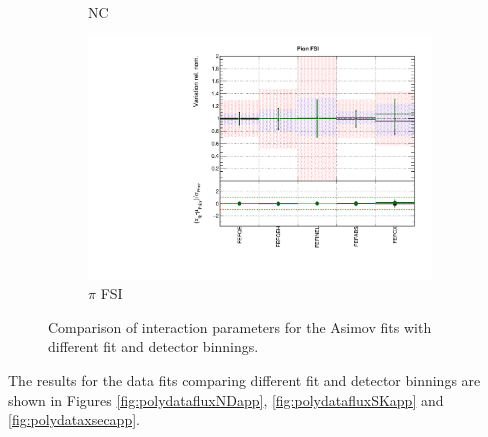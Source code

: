 \begin{figure}[!htbp]
\begin{subfigure}{0.49\textwidth}
  \caption{NC}
\end{subfigure}
\begin{subfigure}{0.49\textwidth}
  \centering
  \includegraphics[width=0.9\linewidth]{figs/polyasmvsxsec_5}
  \caption{$\pi$ FSI}
\end{subfigure}
\caption{Comparison of interaction parameters for the Asimov fits with different fit and detector binnings.}
\label{fig:polyasmvsxsecapp}
\end{figure}

The results for the data fits comparing different fit and detector binnings are shown in Figures \ref{fig:polydatafluxNDapp}, \ref{fig:polydatafluxSKapp} and \ref{fig:polydataxsecapp}.


